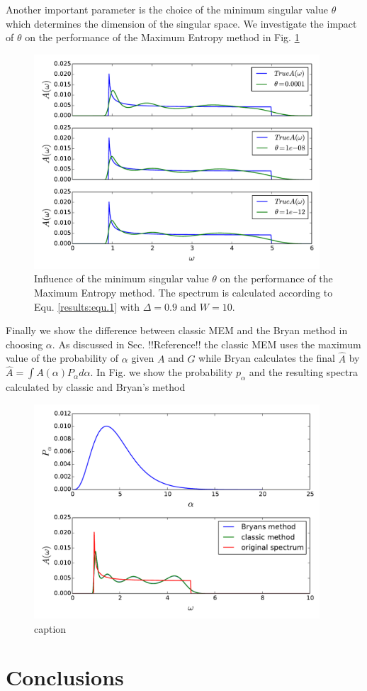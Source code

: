 \documentclass[10pt,letterpaper]{article}
\begin{document}
\FloatBarrier
Another important parameter is the choice of the minimum singular value $\theta$ which determines the dimension of the singular space. We investigate the impact of $\theta$ on the performance of the Maximum Entropy method in Fig. \ref{results:fig.3}
\begin{figure}[htbp]
	\centering
	\includegraphics[width=0.95\textwidth]{./images/BCS_varying_cutoffs.pdf}
	\caption{Influence of the minimum singular value $\theta$ on the performance of the Maximum Entropy method. The spectrum is calculated according to Equ. \ref{results:equ.1} with $\Delta = 0.9$ and $W = 10$.}
	\label{results:fig.3}
\end{figure}
\FloatBarrier
Finally we show the difference between classic MEM and the Bryan method in choosing $\alpha$. As discussed in Sec. !!Reference!! the classic MEM uses the maximum value of the probability of $\alpha$ given $A$ and $G$ while Bryan calculates the final $\hat{A}$ by  $\hat{A} = \int A(\alpha) P_{\alpha} d\alpha$. In Fig. we show the probability $p_{\alpha}$ and the resulting spectra calculated by classic and Bryan's method
\begin{figure}[htbp]
	\centering
	\includegraphics[width=0.95\textwidth]{./images/BCS_Bryan_classic_p_alpha.pdf}
	\caption{caption}
	\label{results:fig.4}
\end{figure}
\section{Conclusions} %
\label{sec:conclusions}
\end{document}
